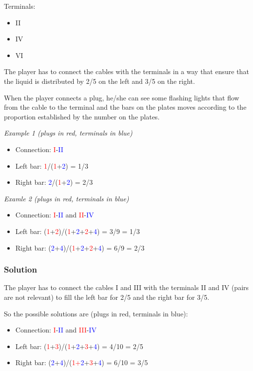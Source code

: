 Terminals:
\begin{itemize}
	\item II
	\item IV
	\item VI
\end{itemize}

The player has to connect the cables with the terminals in a way that ensure that the liquid is distributed by 2/5 on the left and 3/5 on the right.

When the player connects a plug, he/she can see some flashing lights that flow from the cable to the terminal and the bars on the plates moves according to the proportion established by the number on the plates.

\textit{Example 1 (plugs in red, terminals in blue)}
\begin{itemize}
	\item Connection: \textcolor{red}{I}-\textcolor{blue}{II}
	\item Left bar: \textcolor{red}{1}/(\textcolor{red}{1}+\textcolor{blue}{2}) = 1/3
	\item Right bar: \textcolor{blue}{2}/(\textcolor{red}{1}+\textcolor{blue}{2}) = 2/3
\end{itemize}

\textit{Examle 2 (plugs in red, terminals in blue)}
\begin{itemize}
	\item Connection: \textcolor{red}{I}-\textcolor{blue}{II} and \textcolor{red}{II}-\textcolor{blue}{IV}
	\item Left bar: (\textcolor{red}{1}+\textcolor{red}{2})/(\textcolor{red}{1}+\textcolor{blue}{2}+\textcolor{red}{2}+\textcolor{blue}{4}) = 3/9 = 1/3
	\item Right bar: (\textcolor{blue}{2}+\textcolor{blue}{4})/(\textcolor{red}{1}+\textcolor{blue}{2}+\textcolor{red}{2}+\textcolor{blue}{4}) = 6/9 = 2/3
\end{itemize}

\subsubsection*{Solution}
The player has to connect the cables I and III with the terminals II and IV (pairs are not relevant) to fill the left bar for 2/5 and the right bar for 3/5.

So the possible solutions are (plugs in red, terminals in blue):
\begin{itemize}
	\item Connection: \textcolor{red}{I}-\textcolor{blue}{II} and \textcolor{red}{III}-\textcolor{blue}{IV}
	\item Left bar: (\textcolor{red}{1}+\textcolor{red}{3})/(\textcolor{red}{1}+\textcolor{blue}{2}+\textcolor{red}{3}+\textcolor{blue}{4}) = 4/10 = 2/5
	\item Right bar: (\textcolor{blue}{2}+\textcolor{blue}{4})/(\textcolor{red}{1+\textcolor{blue}{2}}+\textcolor{red}{3}+\textcolor{blue}{4}) = 6/10 = 3/5
\end{itemize}

